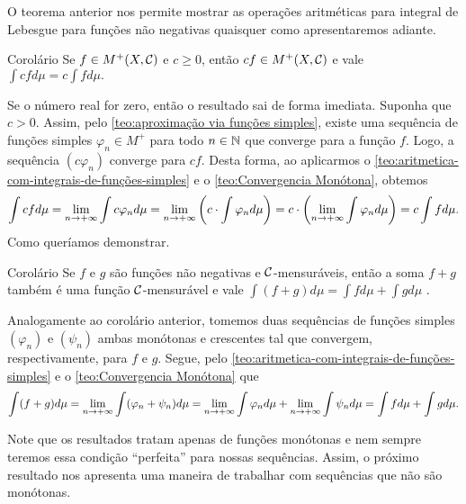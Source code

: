 O teorema anterior nos permite mostrar as operações aritméticas para integral de Lebesgue para funções não negativas quaisquer como apresentaremos adiante.

\begin{env}{Corolário}
	Se $f \in M^+(X, \operatorname{\mathcal{C}})$ e $c \geq 0$, então $cf \in M^+(X, \operatorname{\mathcal{C}})$ e vale
	$ \displaystyle
	\int cf d\mu = c\int f d\mu.
	$
\end{env}


\begin{prova}
	Se o número real for zero, então o resultado sai de forma imediata.
	Suponha que $c > 0$. 
	Assim, pelo  \ref{teo:aproximação via funções simples}, existe uma sequência de funções simples $\varphi_n \in M^+$ para todo $n \in \operatorname{\mathbb{N}}$ que converge para a função $f$.
	Logo, a sequência $(c\varphi_n)$ converge para $cf$.
	Desta forma, ao aplicarmos o \ref{teo:aritmetica-com-integrais-de-funções-simples} e o
	\ref{teo:Convergencia Monótona}, obtemos
	$$
	\int c f d\mu 
	= \displaystyle \lim_{n \to +\infty} \int c\varphi_n d\mu 
	= \displaystyle \lim_{n \to +\infty}\left( c\cdot \int \varphi_n d\mu\right)
	= c\cdot \left(\displaystyle \lim_{n \to +\infty} \int \varphi_n d\mu\right)
	= c \int f d\mu.
	$$
	Como queríamos demonstrar.
\end{prova}

\begin{env}{Corolário}
	\label{cor:soma de integrais de funções não negativas}
	Se $f$ e $g$ são funções não negativas e $\operatorname{\mathcal{C}}$-mensuráveis, então  a soma $f + g$ também é uma função $\operatorname{\mathcal{C}}$-mensurável e vale
	$ \displaystyle
	\int (f + g) d\mu = \int f d\mu + \int g d\mu
	$ \cite{bartle}. 	
\end{env}
\begin{prova}
	Analogamente ao corolário anterior, tomemos duas sequências de funções simples $(\varphi_n)$ e $(\psi_n)$ ambas monótonas e crescentes tal que convergem, respectivamente, para $f$ e $g$.
	Segue, pelo  \ref{teo:aritmetica-com-integrais-de-funções-simples} e o
	\ref{teo:Convergencia Monótona} que
	$$
	\int(f+ g) d\mu
	= \displaystyle \lim_{n \to +\infty} \int (\varphi_n +\psi_n) d\mu
	= \displaystyle \lim_{n \to +\infty}\int \varphi_nd\mu + \displaystyle \lim_{n \to +\infty} \int \psi_n d\mu
	= \int f d\mu + \int g d\mu.
	$$
\end{prova}

Note que os resultados tratam apenas de funções monótonas e nem sempre teremos essa condição \enquote{perfeita} para nossas sequências.
Assim, o próximo resultado nos apresenta uma maneira de trabalhar com sequências que não são monótonas.


